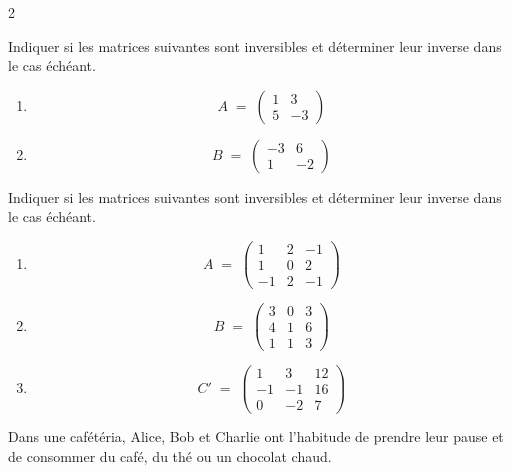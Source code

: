 \documentclass[a4paper,12pt]{article}
\begin{document}
\begin{multicols}{2}
\newpage
\begin{exercice}[title=Exercice 14 $\star$ { [Calculer] }]{}{}
  Indiquer si les matrices suivantes sont inversibles et déterminer leur inverse dans le cas échéant.
  \begin{enumerate}
    \item
      \[
        A \;=\;
        \begin{pmatrix}
          1 & 3\\[6pt]
          5 & -3
        \end{pmatrix}
      \]
    \item
      \[
        B \;=\;
        \begin{pmatrix}
          -3 & 6\\[6pt]
          1 & -2
        \end{pmatrix}
      \]
  \end{enumerate}
\end{exercice}


\begin{exercice}[title=Exercice 15 $\star$ { [Calculer] }]{}{}
  Indiquer si les matrices suivantes sont inversibles et déterminer leur inverse dans le cas échéant.
  \begin{enumerate}
    \item
      \[
        A \;=\;
        \begin{pmatrix}
          1 & 2 & -1\\[6pt]
          1 & 0 & 2\\[6pt]
          -1 & 2 & -1
        \end{pmatrix}
      \]
    \item
      \[
        B \;=\;
        \begin{pmatrix}
          3 & 0 & 3\\[6pt]
          4 & 1 & 6\\[6pt]
          1 & 1 & 3
        \end{pmatrix}
      \]
    \item
      \[
        C' \;=\;
        \begin{pmatrix}
          1 & 3 & 12\\[6pt]
          -1 & -1 & 16\\[6pt]
          0 & -2 & 7
        \end{pmatrix}
      \]
  \end{enumerate}
\end{exercice}

\newcolumn
\begin{exercice}[title=Exercice 16 $\star\star$ { [Modéliser, Calculer] }]{}{}
  Dans une cafétéria, Alice, Bob et Charlie ont l’habitude de prendre leur pause et de consommer du café, du thé ou un chocolat chaud.


\end{exercice}
\end{multicols}
\end{document}
